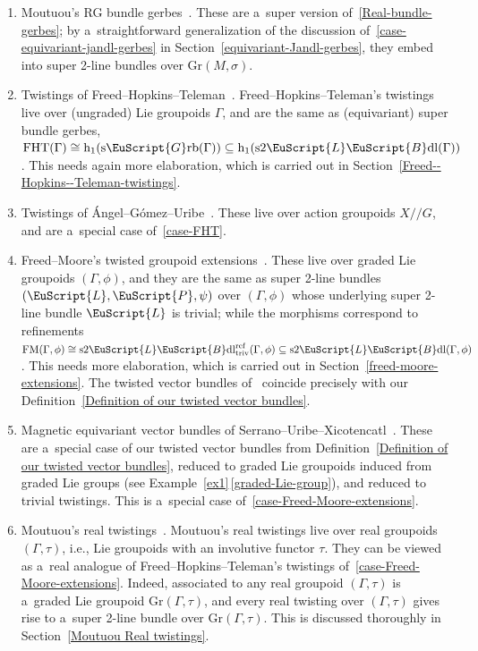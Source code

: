 \documentclass[pdftex]{sigma}
\numberwithin{equation}{section}
\def\mathscr#1{\EuScript{#1}}
\def\hc#1{\mathrm{h}_{#1}}
\def\subset{\subseteq}
\def\act#1#2{#1/\!\!/#2}
\newcommand{\LineBdl}{\mathscr{L}\mathscr{B}\mathrm{dl}}
\newcommand{\stwoLineBdl}{\mathrm{s}2\LineBdl}
\newcommand{\stwoLineBdltriv}{\mathrm{s}2\LineBdl_{\mathrm{triv}}}
\newcommand{\Grb}{\mathscr{G}\mathrm{rb}}
\newcommand{\sGrb}{\mathrm{s}\Grb}
\def\Gr{\mathrm{Gr}}
\begin{document}
\begin{enumerate}[(1)]
\item
Moutuou's RG bundle gerbes~\cite{mohamedmoutuou2012}.
These are a~super version of~\ref{Real-bundle-gerbes}; by a~straightforward generalization of the discussion of~\ref{case-equivariant-jandl-gerbes} in Section~\ref{equivariant-Jandl-gerbes}, they embed into super 2-line bundles over
$\Gr(M,\sigma)$.

 \item
\label{case-FHT}
Twistings of Freed--Hopkins--Teleman~\cite{Freed2011a}.
Freed--Hopkins--Teleman's twistings live over (ungraded) Lie groupoids $\Gamma$, and are the same as (equivariant) super bundle gerbes,
$
\mathrm{FHT}(\Gamma) \cong \hc 1(\sGrb(\Gamma))\subset \hc 1(\stwoLineBdl(\Gamma))$.
This needs again more elaboration, which is carried out in Section~\ref{Freed--Hopkins--Teleman-twistings}.

\item
Twistings of \'Angel--G\'omez--Uribe~\cite{Angel2018}.
These live over action groupoids $\act XG$, and are a~special
case of~\ref{case-FHT}.


\item
\label{case-Freed-Moore-extensions}
Freed--Moore's twisted groupoid extensions~\cite{Freeda}.
These live over graded Lie groupoids $(\Gamma,\phi)$, and they are the same as super 2-line bundles~$(\mathscr{L},\mathscr{P},\psi)$ over $(\Gamma,\phi)$ whose underlying super 2-line bundle $\mathscr{L}$ is trivial; while the morphisms correspond to refinements
$
\mathrm{FM}(\Gamma,\phi)\cong \stwoLineBdltriv^{\text{ref}}(\Gamma,\phi) \subset \stwoLineBdl(\Gamma,\phi)
$.
This needs more elaboration, which is carried out in Section~\ref{freed-moore-extensions}. The twisted vector bundles of~\cite{Freeda} coincide precisely with our Definition~\ref{Definition of our twisted vector bundles}.

\item
Magnetic equivariant vector bundles of Serrano--Uribe--Xicotencatl~\cite{serrano2024rationalmagneticequivariantktheory}.
These are a~special case of our twisted vector bundles from Definition~\ref{Definition of our twisted vector bundles}, reduced to graded Lie groupoids induced from graded Lie groups (see Example~\ref{ex1}\,\ref{graded-Lie-group}), and reduced to trivial twistings. This is a~special case of~\ref{case-Freed-Moore-extensions}.

\item
\label{Moutuou}
Moutuou's real twistings~\cite{mohamedmoutuou2012}.
Moutuou's real twistings live over real groupoids $(\Gamma,\tau)$, i.e., Lie groupoids with an involutive functor $\tau$. They can be viewed as a~real analogue of Freed--Hopkins--Teleman's twistings of~\ref{case-Freed-Moore-extensions}. Indeed, associated to any real groupoid $(\Gamma,\tau)$ is a~graded Lie groupoid $\Gr(\Gamma,\tau)$, and every
real twisting over $(\Gamma,\tau)$ gives rise to a~super 2-line bundle over $\Gr(\Gamma,\tau)$. This is discussed thoroughly in Section~\ref{Moutuou Real twistings}.


\end{enumerate}
\end{document}
